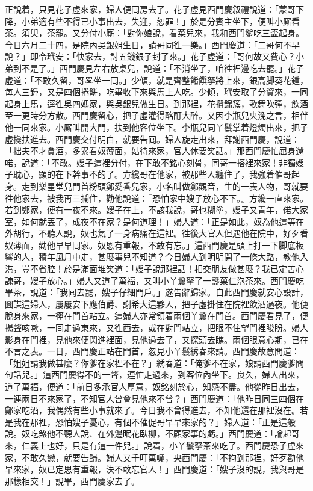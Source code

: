 正說着，只見花子虛來家，婦人便囘房去了。花子虛見西門慶叙禮說道：「蒙哥下降，小弟適有些不得已小事出去，失迎，恕罪！」於是分賓主坐下，便叫小厮看茶。須臾，茶罷。又分付小厮：「對你娘說，看菜兒來，我和西門爹吃三盃起身。今日六月二十四，是院內吳銀姐生日，請哥同徃一樂。」西門慶道：「二哥何不早說？」即令玳安：「快家去，討五錢銀子封了來。」花子虛道：「哥何故又費心？小弟到不是了。」西門慶見左右放桌兒，說道：「不消坐了，咱徃裡邊吃去罷。」花子虛道：「不敢久留，哥畧坐一囘。」少傾，就是齊整餚饌拏將上來，銀高脚葵花鍾，每人三鍾，又是四個捲餅，吃畢收下來與馬上人吃。少傾，玳安取了分資來，一同起身上馬，逕徃吳四媽家，與吳銀兒做生日。到那裡，花攢錦簇，歌舞吹彈，飲酒至一更時分方散。西門慶留心，把子虛灌得酩酊大醉。又因李瓶兒央浼之言，相伴他一同來家。小厮叫開大門，扶到他客位坐下。李瓶兒同丫鬟掌着燈燭出來，把子虛攙扶進去。西門慶交付明白，就要告囘。婦人旋走出來，拜謝西門慶，說道：「拙夫不才貪酒，多累看奴薄面，{}姑待來家，官人休要笑話。」那西門慶忙屈身還喏，說道：「不敢。嫂子這裡分付，在下敢不銘心刻骨，同哥一搭裡來家！非獨嫂子耽心，顯的在下幹事不的了。方纔哥在他家，被那些人纏住了，我強着催哥起身。走到樂星堂兒門首粉頭鄭愛香兒家，{}小名叫做鄭觀音，生的一表人物，哥就要徃他家去，被我再三攔住，勸他說道：『恐怕家中嫂子放心不下。』方纔一直來家。若到鄭家，便有一夜不來。{}嫂子在上，不該我說，哥也糊塗，嫂子又青年，{}偌大家室，如何就丟了，成夜不在家？是何道理！」婦人道：「正是如此，奴為他這等在外胡行，不聽人說，奴也氣了一身病痛在這裡。{}徃後大官人但遇他在院中，好歹看奴薄面，勸他早早囘家。奴恩有重報，不敢有忘。」{}這西門慶是頭上打一下脚底板響的人，積年風月中走，甚麼事兒不知道？今日婦人到明明開了一條大路，教他入港，豈不省腔！於是滿面堆笑道：「嫂子說那裡話！相交朋友做甚麼？我已定苦心諫哥，嫂子放心。」婦人又道了萬福，又叫小丫鬟拏了一盞菓仁泡茶來。西門慶吃畢茶，說道：「我囘去罷，嫂子仔細門戶。」遂告辭歸家。自此西門慶就安心設計，圖謀這婦人，屢屢安下應伯爵、謝希大這夥人，把子虛掛住在院裡飲酒過夜。他便脫身來家，一徑在門首站立。這婦人亦常領着兩個丫鬟在門首。西門慶看見了，便揚聲咳嗽，一囘走過東來，又徃西去，{}或在對門站立，把眼不住望門裡睃盼。婦人影身在門裡，見他來便閃進裡面，見他過去了，又探頭去瞧。兩個眼意心期，已在不言之表。一日，西門慶正站在門首，忽見小丫鬟綉春來請。西門慶故意問道：「姐姐請我做甚麼？你爹在家裡不在？」綉春道：「俺爹不在家，娘請西門慶爹問句話兒。」這西門慶得不的一聲，連忙走過來，到客位內坐下。良久，婦人出來，道了萬福，便道：「前日多承官人厚意，奴銘刻於心，知感不盡。他從昨日出去，一連兩日不來家了，不知官人曾會見他來不曾？」西門慶道：「他昨日同三四個在鄭家吃酒，我偶然有些小事就來了。今日我不曾得進去，不知他還在那裡沒在。若是我在那裡，恐怕嫂子憂心，有個不催促哥早早來家的？」婦人道：「正是這般說。奴吃煞他不聽人說、在外邊眠花臥柳，不顧家事的虧。」西門慶道：「論起哥來，仁義上也好，只是有這一件兒。」說着，小丫鬟拏茶來吃了。西門慶恐子虛來家，不敢久戀，就要告歸。婦人又千叮萬囑，央西門慶：「不拘到那裡，好歹勸他早來家，奴已定恩有重報，決不敢忘官人！」{}西門慶道：「嫂子沒的說，我與哥是那樣相交！」說畢，西門慶家去了。

